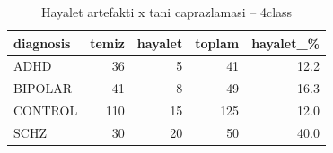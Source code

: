 \begin{table}[htbp]
  \centering
  \caption{Hayalet artefakti x tani caprazlamasi -- 4class}
  \label{tab:ghost_4class}
  \small
  \begin{tabular}{lrrrr}
    \toprule
    diagnosis & temiz & hayalet & toplam & hayalet\_\% \\
    \midrule
    ADHD & 36 & 5 & 41 & 12.2 \\
    BIPOLAR & 41 & 8 & 49 & 16.3 \\
    CONTROL & 110 & 15 & 125 & 12.0 \\
    SCHZ & 30 & 20 & 50 & 40.0 \\
    \bottomrule
  \end{tabular}
\end{table}
